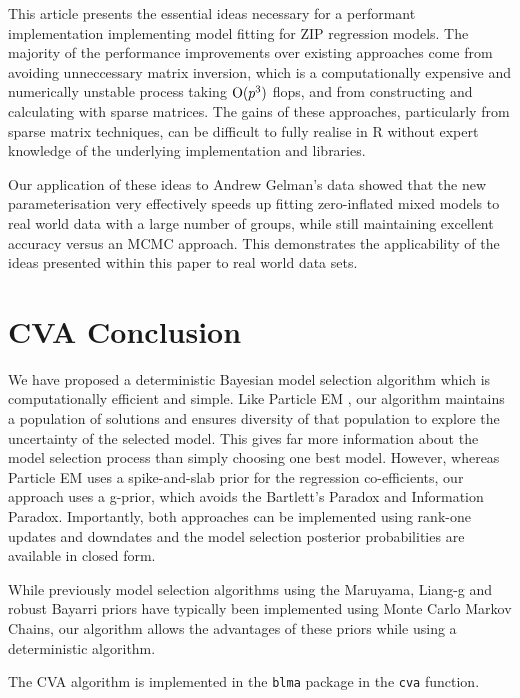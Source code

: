 This article presents the essential ideas necessary for a performant implementation implementing model fitting
for ZIP regression models.%
The majority of the performance
improvements over existing approaches come from avoiding unneccessary matrix inversion, which is a
computationally expensive and numerically unstable process taking $\text{O}(p^3)$ flops, and from constructing and 
calculating	with sparse matrices. The gains of these approaches, particularly from sparse matrix techniques, 
can be difficult to fully realise in R without expert knowledge of the underlying implementation and libraries.
		
Our application of these ideas to Andrew Gelman's data showed that the new parameterisation very effectively
speeds up fitting zero-inflated mixed models to real world data with a large number of groups, while still
maintaining excellent accuracy versus an MCMC approach. This demonstrates the applicability of the ideas
presented within this paper to real world data sets.
		
\section{CVA Conclusion}

We have proposed a deterministic Bayesian model selection algorithm which is computationally efficient
and simple. Like Particle EM \cite{Rockova2017}, our algorithm maintains a population of solutions and ensures
diversity of that population to explore the uncertainty of the selected model. This gives far more information
about the model selection process than simply choosing one best model. However, whereas Particle EM uses
a spike-and-slab prior for the regression co-efficients, our approach uses a g-prior, which avoids 
the Bartlett's Paradox and Information Paradox. Importantly, both approaches can be implemented using rank-one
updates and downdates and the model selection posterior probabilities are available in closed form.

While previously model selection algorithms using the Maruyama, Liang-g and robust Bayarri priors have
typically been implemented using Monte Carlo Markov Chains, our algorithm allows the advantages of these
priors while using a deterministic algorithm.

The CVA algorithm is implemented in the {\tt blma} package in the {\tt cva} function.
